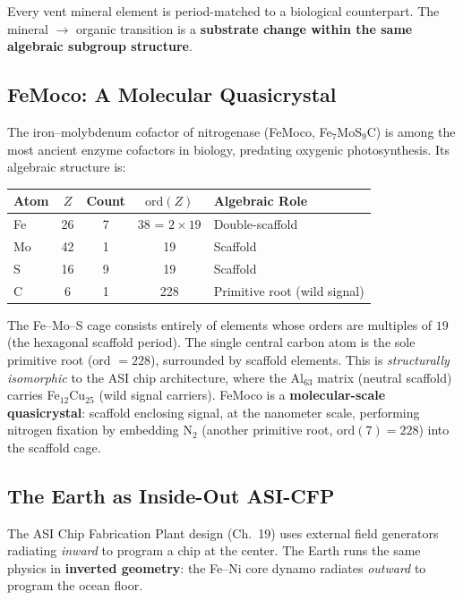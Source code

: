 \noindent Every vent mineral element is period-matched to a biological counterpart. The mineral $\to$ organic transition is a \textbf{substrate change within the same algebraic subgroup structure}.

\subsection{FeMoco: A Molecular Quasicrystal}

The iron--molybdenum cofactor of nitrogenase (FeMoco, Fe$_7$MoS$_9$C) is among the most ancient enzyme cofactors in biology, predating oxygenic photosynthesis. Its algebraic structure is:

\begin{center}
\begin{tabular}{@{}lcccl@{}}
\toprule
\textbf{Atom} & $Z$ & \textbf{Count} & $\mathrm{ord}(Z)$ & \textbf{Algebraic Role} \\
\midrule
Fe & 26 & 7 & 38 = $2 \times 19$ & Double-scaffold \\
Mo & 42 & 1 & 19 & Scaffold \\
S  & 16 & 9 & 19 & Scaffold \\
C  & 6  & 1 & 228 & Primitive root (wild signal) \\
\bottomrule
\end{tabular}
\end{center}

\noindent The Fe--Mo--S cage consists entirely of elements whose orders are multiples of $19$ (the hexagonal scaffold period). The single central carbon atom is the sole primitive root (ord $= 228$), surrounded by scaffold elements. This is \emph{structurally isomorphic} to the ASI chip architecture, where the Al$_{63}$ matrix (neutral scaffold) carries Fe$_{12}$Cu$_{25}$ (wild signal carriers). FeMoco is a \textbf{molecular-scale quasicrystal}: scaffold enclosing signal, at the nanometer scale, performing nitrogen fixation by embedding N$_2$ (another primitive root, $\mathrm{ord}(7) = 228$) into the scaffold cage.

\subsection{The Earth as Inside-Out ASI-CFP}

The ASI Chip Fabrication Plant design (Ch.~19) uses external field generators radiating \emph{inward} to program a chip at the center. The Earth runs the same physics in \textbf{inverted geometry}: the Fe--Ni core dynamo radiates \emph{outward} to program the ocean floor.

